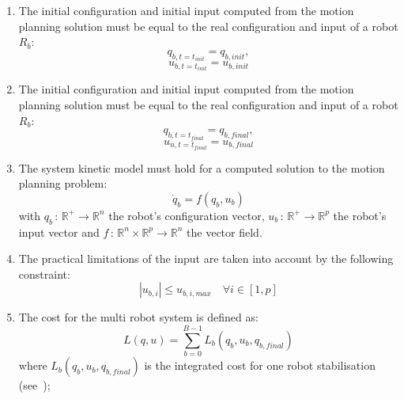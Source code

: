 \documentclass[eprint]{actapoly}
\begin{document}
\begin{enumerate}

    \item The initial configuration and initial input
    computed from the motion planning solution must
    be equal to the real configuration and input of a
    robot $R_b$:
    \begin{equation}
        q_{b,t=t_{init}} = q_{b,init},
    \end{equation}
    \begin{equation}
        u_{b,t=t_{init}} = u_{b,init}
    \end{equation}

    \item The initial configuration and initial input
    computed from the motion planning solution must
    be equal to the real configuration and input of a
    robot $R_b$:
    \begin{equation}\label{eq:finalconfig}
        q_{b,t=t_{final}} = q_{b,final},
    \end{equation}
    \begin{equation}\label{eq:finalinput}
        u_{n,t=t_{final}} = u_{b,final}
    \end{equation}


    \item The system kinetic model must hold for a computed solution to the
    motion planning problem:
    \begin{equation}
        \dot{q}_b = f(q_b,u_b)
    \end{equation}
	with $q_b\,:\,\mathbb{R}^{+}\rightarrow \mathbb{R}^n$ the robot's configuration
	vector,
	$u_b\,:\,\mathbb{R}^{+}\rightarrow \mathbb{R}^p$ the robot's input vector and
	\mbox{$f\,:\,\mathbb{R}^{n}\times \mathbb{R}^{p}\rightarrow \mathbb{R}^n$} the
	vector field.
    
    \item The practical limitations of the input are taken into account by the
    following constraint:
    \begin{equation}
        |u_{b,i}| \leq u_{b,i,max}\quad \forall i \in [1, p]
    \end{equation}
    
    \item The cost for the multi robot system is defined as:
    \begin{equation}
        L(q,u) = \sum_{b=0}^{B-1}L_b(q_b, u_b, q_{b,final})
    \end{equation}
    where $L_b(q_b, u_b, q_{b,final})$ is the integrated cost for one robot
    stabilisation (see~\cite{Deffort2009});
    

\end{enumerate}
\end{document}
